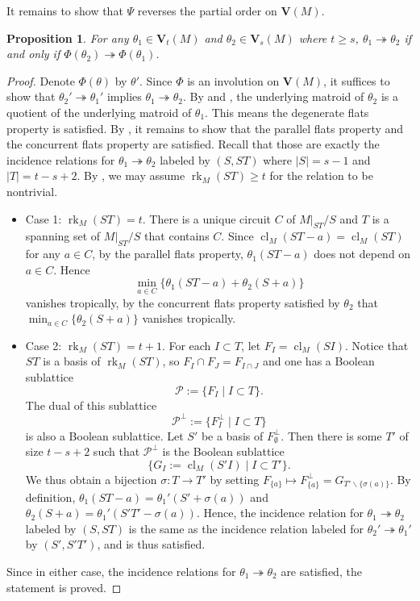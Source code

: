 \documentclass{article}
\newtheorem{proposition}[theorem]{Proposition}
\theoremstyle{definition}
\newcommand{\onto}{\twoheadrightarrow}
\newcommand{\rk}{\operatorname{rk}}
\newcommand{\cl}{\operatorname{cl}}
\newcommand{\cP}{\mathcal{P}}
\newcommand{\bV}{\mathbf V}
\begin{document}
It remains to show that $\Psi$ reverses the partial order on $\bV(M)$.



\begin{proposition}\label{prop:order-reversing}
         For any $\theta_1\in \bV_t(M)$ and $\theta_2\in \bV_s(M)$ where $t\geq s$, $\theta_1\onto \theta_2$ if and only if $\Phi(\theta_2) \onto \Phi(\theta_1)$.
\end{proposition}

\begin{proof}
Denote $\Phi(\theta)$ by $\theta'$. Since $\Phi$ is an involution on $\bV(M)$, it suffices to show that $\theta_2'\onto \theta_1'$ implies $\theta_1\onto \theta_2$. By  and , the underlying matroid of $\theta_2$ is a quotient of the underlying matroid of $\theta_1$. This means the degenerate flats property is satisfied. By , it remains to show that the parallel flats property and the concurrent flats property are satisfied. Recall that those are exactly the incidence relations for $\theta_1\onto \theta_2$ labeled by $(S,S T)$ where $|S|=s-1$ and $|T|=t-s+2$. By , we may assume $\rk_M(S T)\geq t$ for the relation to be nontrivial.
\begin{itemize}
    \item Case 1: $\rk_M(S T)=t$. There is a unique circuit $C$ of $M|_{ST}/S$ and $T$ is a spanning set of $M|_{ST}/S$ that contains $C$. Since $\cl_M(S T-a)=\cl_M(S T)$ for any $a\in C$, by the parallel flats property, $\theta_1(ST-a)$ does not depend on $a\in C$. Hence
    \[\min_{a\in C}\{\theta_1(S T-a)+\theta_2(S+a)\}\]
    vanishes tropically, by the concurrent flats property satisfied by $\theta_2$ that $\min_{a\in C}\{\theta_2(S+a)\}$ vanishes tropically.

    \item Case 2: $\rk_M(S T)=t+1$. For each $I\subset T$, let $F_I=\cl_M(S I)$. Notice that $S T$ is a basis of $\rk_M(S T)$, so $F_I\cap F_J=F_{I\cap J}$ and one has a Boolean sublattice
    \[\cP:=\{F_I\mid I\subset T\}.\]
    The dual of this sublattice 
    \[\cP^\perp:=\{F_I^\perp \mid I\subset T\}\]
    is also a Boolean sublattice. Let $S'$ be a basis of $F_\emptyset^\perp$. Then there is some $T'$ of size $t-s+2$ such that $\cP^\perp$ is the Boolean sublattice 
    \[\{G_I:=\cl_M(S' I)\mid I\subset T'\}.\]
    We thus obtain a bijection $\sigma \colon T \to T'$ by setting $F_{\{a\}}\mapsto F_{\{a\}}^\perp = G_{T'\smallsetminus\{\sigma(a)\}}$. By definition, $\theta_1(ST-a)=\theta_1'(S'+\sigma(a))$ and $\theta_2(S+a)=\theta_1'(S'T'-\sigma(a))$. Hence, the incidence relation for $\theta_1\onto\theta_2$ labeled by $(S,ST)$ is the same as the incidence relation labeled for $\theta_2'\onto \theta_1'$ by $(S',S'T')$, and is thus satisfied.
\end{itemize}
Since in either case, the incidence relations for $\theta_1\onto \theta_2$ are satisfied, the statement is proved.
\end{proof}
\end{document}
